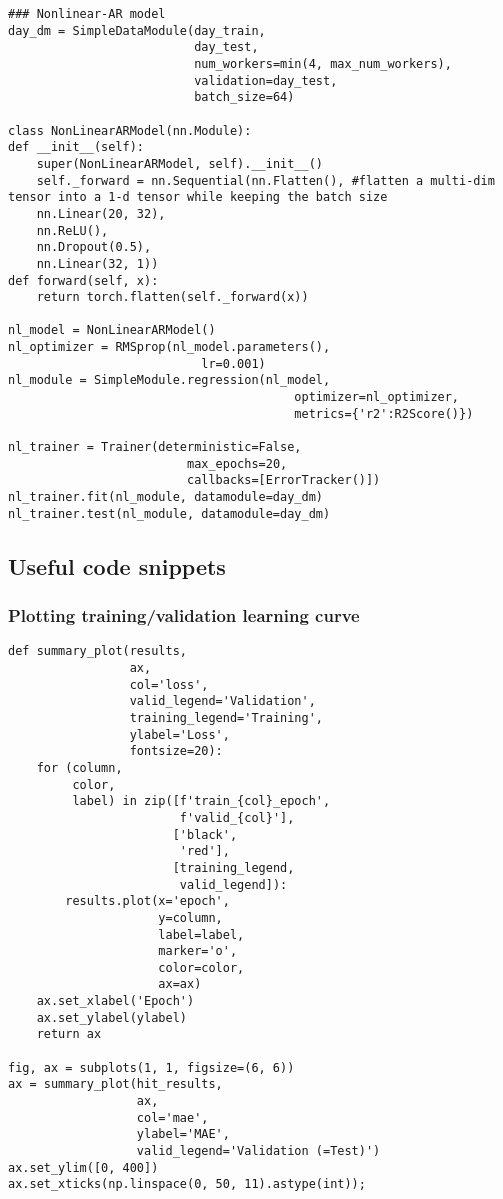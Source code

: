 \documentclass[
  letterpaper,
  DIV=11,
  numbers=noendperiod]{scrreprt}
\begin{document}
\begin{verbatim}
### Nonlinear-AR model
day_dm = SimpleDataModule(day_train,
                          day_test,
                          num_workers=min(4, max_num_workers),
                          validation=day_test,
                          batch_size=64)

class NonLinearARModel(nn.Module):
def __init__(self):
    super(NonLinearARModel, self).__init__()
    self._forward = nn.Sequential(nn.Flatten(), #flatten a multi-dim tensor into a 1-d tensor while keeping the batch size
    nn.Linear(20, 32),
    nn.ReLU(),
    nn.Dropout(0.5),
    nn.Linear(32, 1))
def forward(self, x):
    return torch.flatten(self._forward(x))

nl_model = NonLinearARModel()
nl_optimizer = RMSprop(nl_model.parameters(),
                           lr=0.001)
nl_module = SimpleModule.regression(nl_model,
                                        optimizer=nl_optimizer,
                                        metrics={'r2':R2Score()})
                                        
nl_trainer = Trainer(deterministic=False,
                         max_epochs=20,
                         callbacks=[ErrorTracker()])
nl_trainer.fit(nl_module, datamodule=day_dm)
nl_trainer.test(nl_module, datamodule=day_dm) 
\end{verbatim}

\subsection{Useful code snippets}\label{useful-code-snippets-3}

\subsubsection{Plotting training/validation learning
curve}\label{plotting-trainingvalidation-learning-curve}

\begin{verbatim}
def summary_plot(results,
                 ax,
                 col='loss',
                 valid_legend='Validation',
                 training_legend='Training',
                 ylabel='Loss',
                 fontsize=20):
    for (column,
         color,
         label) in zip([f'train_{col}_epoch',
                        f'valid_{col}'],
                       ['black',
                        'red'],
                       [training_legend,
                        valid_legend]):
        results.plot(x='epoch',
                     y=column,
                     label=label,
                     marker='o',
                     color=color,
                     ax=ax)
    ax.set_xlabel('Epoch')
    ax.set_ylabel(ylabel)
    return ax
    
fig, ax = subplots(1, 1, figsize=(6, 6))
ax = summary_plot(hit_results,
                  ax,
                  col='mae',
                  ylabel='MAE',
                  valid_legend='Validation (=Test)')
ax.set_ylim([0, 400])
ax.set_xticks(np.linspace(0, 50, 11).astype(int));
\end{verbatim}
\end{document}
